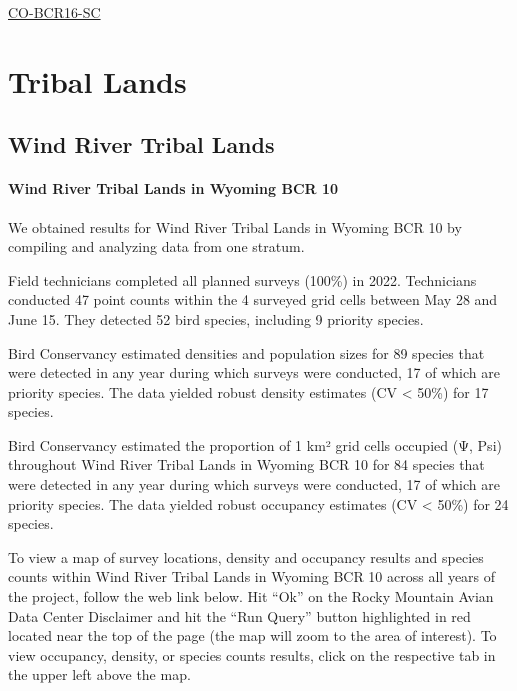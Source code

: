 \documentclass[
  letterpaper,
  DIV=11,
  numbers=noendperiod,
  oneside]{scrreprt}
\begin{document}
\href{http://www.rmbo.org/new_site/adc/QueryWindow.aspx\#N4IgzgLgTghhCuBbEAuABCAwgeQLQCFMAlARgDZcBlTdAOTgEsB7AOxgBs0AFGKAazSUAplABuDAMZC0uQU3gQAFiJZpMTdk1gATJt3ZwhMeGlpCIAdy18QAXyA=}{CO-BCR16-SC}

\hypertarget{tribal-lands}{%
\chapter{Tribal Lands}\label{tribal-lands}}

\hypertarget{wind-river-tribal-lands}{%
\section{Wind River Tribal Lands}\label{wind-river-tribal-lands}}

\hypertarget{wind-river-tribal-lands-in-wyoming-bcr-10}{%
\subsubsection{Wind River Tribal Lands in Wyoming BCR
10}\label{wind-river-tribal-lands-in-wyoming-bcr-10}}

We obtained results for Wind River Tribal Lands in Wyoming BCR 10 by
compiling and analyzing data from one stratum.

Field technicians completed all planned surveys (100\%) in 2022.
Technicians conducted 47 point counts within the 4 surveyed grid cells
between May 28 and June 15. They detected 52 bird species, including 9
priority species.

Bird Conservancy estimated densities and population sizes for 89 species
that were detected in any year during which surveys were conducted, 17
of which are priority species. The data yielded robust density estimates
(CV \textless{} 50\%) for 17 species.

Bird Conservancy estimated the proportion of 1 km² grid cells occupied
(Ψ, Psi) throughout Wind River Tribal Lands in Wyoming BCR 10 for 84
species that were detected in any year during which surveys were
conducted, 17 of which are priority species. The data yielded robust
occupancy estimates (CV \textless{} 50\%) for 24 species.

To view a map of survey locations, density and occupancy results and
species counts within Wind River Tribal Lands in Wyoming BCR 10 across
all years of the project, follow the web link below. Hit ``Ok'' on the
Rocky Mountain Avian Data Center Disclaimer and hit the ``Run Query''
button highlighted in red located near the top of the page (the map will
zoom to the area of interest). To view occupancy, density, or species
counts results, click on the respective tab in the upper left above the
map.
\end{document}
